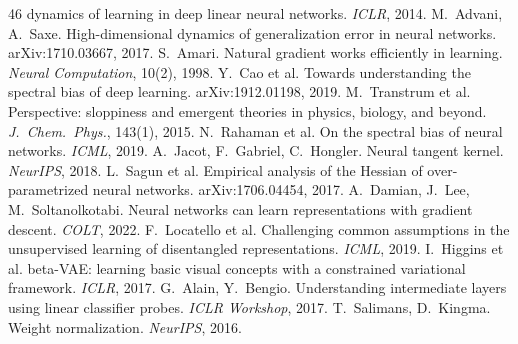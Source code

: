 \documentclass[twocolumn,10pt]{article}
\begin{document}
\begin{thebibliography}{46}
dynamics of learning in deep linear neural networks. \emph{ICLR}, 2014.
 M.~Advani, A.~Saxe. High-dimensional dynamics of generalization error in
neural networks. arXiv:1710.03667, 2017.
 S.~Amari. Natural gradient works efficiently in learning. \emph{Neural
Computation}, 10(2), 1998.
 Y.~Cao et al. Towards understanding the spectral bias of deep learning.
arXiv:1912.01198, 2019.
 M.~Transtrum et al. Perspective: sloppiness and emergent theories in
physics, biology, and beyond. \emph{J.\ Chem.\ Phys.}, 143(1), 2015.
 N.~Rahaman et al. On the spectral bias of neural networks. \emph{ICML},
2019.
 A.~Jacot, F.~Gabriel, C.~Hongler. Neural tangent kernel. \emph{NeurIPS},
2018.
 L.~Sagun et al. Empirical analysis of the Hessian of over-parametrized
neural networks. arXiv:1706.04454, 2017.
 A.~Damian, J.~Lee, M.~Soltanolkotabi. Neural networks can learn
representations with gradient descent. \emph{COLT}, 2022.
 F.~Locatello et al. Challenging common assumptions in the unsupervised
learning of disentangled representations. \emph{ICML}, 2019.
 I.~Higgins et al. beta-VAE: learning basic visual concepts with a
constrained variational framework. \emph{ICLR}, 2017.
 G.~Alain, Y.~Bengio. Understanding intermediate layers using linear
classifier probes. \emph{ICLR Workshop}, 2017.
 T.~Salimans, D.~Kingma. Weight normalization. \emph{NeurIPS}, 2016.
\end{thebibliography}
\end{document}
